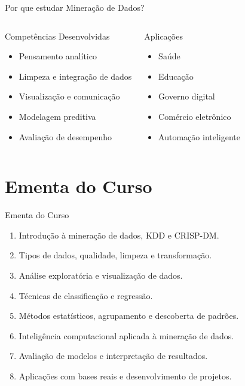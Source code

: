 \documentclass[aspectratio=169]{beamer}
\begin{document}
\begin{frame}{Por que estudar Mineração de Dados?}
    \begin{columns}[T]
        \begin{block}{Competências Desenvolvidas}
            \begin{itemize}
                \item Pensamento analítico
                \item Limpeza e integração de dados
                \item Visualização e comunicação
                \item Modelagem preditiva
                \item Avaliação de desempenho
            \end{itemize}
        \end{block}

        \begin{alertblock}{Aplicações}
            \begin{itemize}
                \item Saúde
                \item Educação
                \item Governo digital
                \item Comércio eletrônico
                \item Automação inteligente
            \end{itemize}
        \end{alertblock}
    \end{columns}
\end{frame}

\section{Ementa do Curso}

\begin{frame}{Ementa do Curso}
    \small
    \begin{enumerate}
        \item Introdução à mineração de dados, KDD e CRISP-DM.
        \item Tipos de dados, qualidade, limpeza e transformação.
        \item Análise exploratória e visualização de dados.
        \item Técnicas de classificação e regressão.
        \item Métodos estatísticos, agrupamento e descoberta de padrões.
        \item Inteligência computacional aplicada à mineração de dados.
        \item Avaliação de modelos e interpretação de resultados.
        \item Aplicações com bases reais e desenvolvimento de projetos.
    \end{enumerate}
\end{frame}
\end{document}
